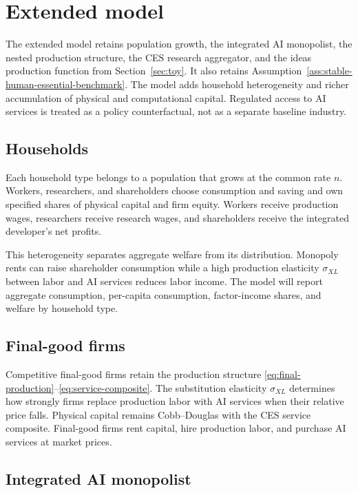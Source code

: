 \section{Extended model}
\label{sec:extended}

The extended model retains population growth, the integrated AI monopolist, the
nested production structure, the CES research aggregator, and the ideas production
function from Section~\ref{sec:toy}. It also retains
Assumption~\ref{ass:stable-human-essential-benchmark}. The model adds household
heterogeneity and richer accumulation of physical and computational capital. Regulated access to AI services
is treated as a policy counterfactual, not as a separate baseline industry.

\subsection{Households}

Each household type belongs to a population that grows at the common rate $n$.
Workers, researchers, and shareholders choose consumption and saving and own
specified shares of physical capital and firm equity. Workers receive production
wages, researchers receive research wages, and shareholders receive the integrated
developer's net profits.

This heterogeneity separates aggregate welfare from its distribution. Monopoly rents
can raise shareholder consumption while a high production elasticity $\sigma_{XL}$
between labor and AI services reduces labor income. The model will report aggregate
consumption, per-capita consumption, factor-income shares, and welfare by household type.

\subsection{Final-good firms}

Competitive final-good firms retain the production structure
\eqref{eq:final-production}--\eqref{eq:service-composite}. The substitution elasticity
$\sigma_{XL}$ determines how strongly firms replace production labor with AI services when
their relative price falls. Physical capital remains Cobb--Douglas with the CES
service composite. Final-good firms rent capital, hire production labor, and purchase
AI services at market prices.

\subsection{Integrated AI monopolist}

